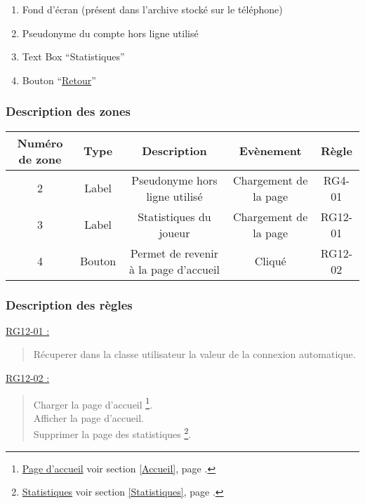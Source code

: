 \documentclass{report}
\begin{document}
		\begin{enumerate}
		  \item Fond d'écran (présent dans l'archive stocké sur le téléphone)
		  \item Pseudonyme du compte hors ligne utilisé
		  \item Text Box ``Statistiques''
		  \item Bouton ``\hyperlink{Accueil}{Retour}''
		\end{enumerate}

		\subsubsection{Description des zones}
		
			\begin{tabular}{|c|c|c|c|c|} \hline
				Numéro de zone & Type  & Description & Evènement &	Règle \\\hline
				2 & Label & Pseudonyme hors ligne utilisé & Chargement de la page & RG4-01 \\\hline
				3 & Label & Statistiques du joueur & Chargement de la page & RG12-01 \\\hline
				4 & Bouton & Permet de revenir à la page d'accueil & Cliqué & RG12-02 \\\hline 
			\end{tabular}
			
		\subsubsection{Description des règles}

			\underline{RG12-01 :}
				\begin{quote}
					Récuperer dans la classe utilisateur la valeur de la connexion automatique.\\
				\end{quote}
				
			\underline{RG12-02 :}
				\begin{quote}
					Charger la page d'accueil%
						\footnote[3]{
							\hyperlink{Page d'accueil}{Page d'accueil}
							\og voir section \ref{Accueil}, page \pageref{Accueil}.\fg
						}.\\
					Afficher la page d'accueil\footnotemark[3].\\
					Supprimer la page des statistiques%
						\footnote[2]{
							\hyperlink{Statistiques}{Statistiques}
							\og voir section \ref{Statistiques}, page \pageref{Statistiques}.\fg
						}.\\		
				\end{quote}
				
\end{document}
